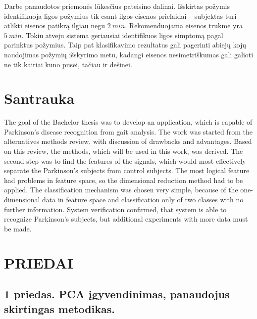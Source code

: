 \documentclass[]{vgtuef}
\begin{document}

Darbe panaudotos priemonės lūkesčius pateisino dalinai. Išskirtas požymis identifikuoja ligos požymius tik esant ilgos eisenos prielaidai -- subjektas turi atlikti eisenos patikrą ilgiau negu $2~min$. Rekomenduojama eisenos trukmė yra $5~min$. Tokiu atveju sistema geriausiai identifikuos ligos simptomą pagal parinktus požymius. Taip pat klasifikavimo rezultatus gali pagerinti abiejų kojų naudojimas požymių išskyrimo metu, kadangi eisenos nesimetriškumas gali galioti ne tik kairiai kūno pusei, tačiau ir dešinei.

\renewcommand\refname{Literatūros ir informacinių šaltinių sąrašas}




\section*{Santrauka}

The goal of the Bachelor thesis was to develop an application, which is capable of Parkinson's disease recognition from gait analysis. The work was started from the alternatives methods review, with discussion of drawbacks and advantages. Based on this review, the methods, which will be used in this work, was derived. The second step was to find the features of the signals, which would most effectively separate the Parkinson's subjects from control subjects. The most logical feature had problems in feature space, so the dimensional reduction method had to be applied. The classification mechanism was chosen very simple, because of the one-dimensional data in feature space and classification only of two classes with no further information. System verification confirmed, that system is able to recognize Parkinson's subjects, but additional experiments with more data must be made.

\section*{PRIEDAI}

\subsection*{1 priedas. PCA įgyvendinimas, panaudojus skirtingas metodikas.}
\label{subsec:pca_source}
\end{document}
